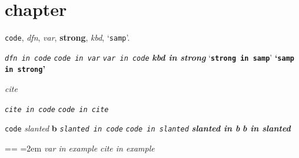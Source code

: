 \documentclass{book}
\makeatletter
\newcommand\GNUTexinfocommandstyletextcite[1]{{\normalfont{}\textsl{#1}}}%
\newcommand\GNUTexinfocommandstyletextkbd[1]{{\ttfamily\textsl{#1}}}%
\newcommand\GNUTexinfocommandstyletextvar[1]{{\normalfont{}\textsl{#1}}}%
\newenvironment{GNUTexinfopreformatted}{%
  \par\obeylines\obeyspaces\frenchspacing
  \parskip=\z@\parindent=\z@}{}
\makeatother
\begin{document}
\label{anchor:Top}%
\chapter{{chapter}}
\label{anchor:chapter}%

\texttt{code}, \textsl{dfn}, \GNUTexinfocommandstyletextvar{var}, \textbf{strong}, \GNUTexinfocommandstyletextkbd{kbd}, `\texttt{samp}'.

\texttt{\textsl{dfn in code}}
\GNUTexinfocommandstyletextvar{\texttt{code in var}}
\texttt{\GNUTexinfocommandstyletextvar{var in code}}
\textbf{\GNUTexinfocommandstyletextkbd{kbd in strong}}
`\texttt{\textbf{strong in samp}}'
\textbf{`\texttt{samp in strong}'}

\GNUTexinfocommandstyletextcite{cite}

\texttt{\GNUTexinfocommandstyletextcite{cite in code}}
\GNUTexinfocommandstyletextcite{\texttt{code in cite}}

\texttt{code} \textsl{slanted} \textbf{b}
\texttt{\textsl{slanted in code}}
\textsl{\texttt{code in slanted}}
\textbf{\textsl{slanted in b}}
\textsl{\textbf{b in slanted}}

\begin{GNUTexinfopreformatted}
\leftskip=2em\relax\ttfamily%
\GNUTexinfocommandstyletextvar{var in example}
\GNUTexinfocommandstyletextcite{cite in example}
\end{GNUTexinfopreformatted}
\end{document}
